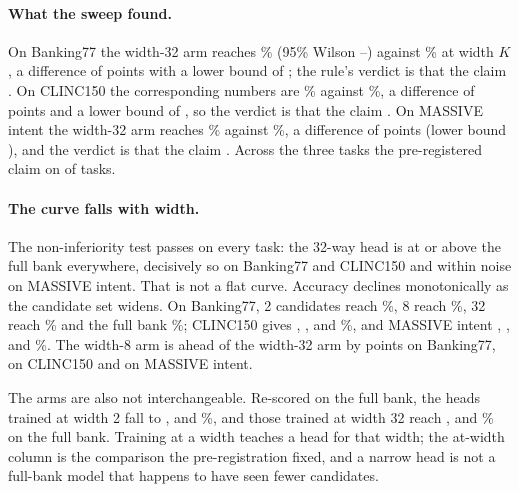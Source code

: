 

\paragraph{What the sweep found.} On Banking77 the width-32 arm reaches
\EBankWThirtyTwo\% (95\% Wilson \EBankWThirtyTwoLo--\EBankWThirtyTwoHi) against \EBankWK\% at
width \(K\), a difference of \EBankDelta{} points with a lower bound of
\EBankLower{}; the rule's verdict is that the claim \EBankVerdict. On CLINC150
the corresponding numbers are \EClincWThirtyTwo\% against \EClincWK\%, a
difference of \EClincDelta{} points and a lower bound of \EClincLower, so the
verdict is that the claim \EClincVerdict. On MASSIVE intent the width-32 arm
reaches \EMassiveWThirtyTwo\% against \EMassiveWK\%, a difference of
\EMassiveDelta{} points (lower bound \EMassiveLower), and the verdict is that the
claim \EMassiveVerdict. Across the three tasks the pre-registered claim
\EAggregateVerdict{} on \EHolds{} of \ETasks{} tasks.

\paragraph{The curve falls with width.} The non-inferiority test passes on every
task: the 32-way head is at or above the full bank everywhere, decisively so on
Banking77 and CLINC150 and within noise on MASSIVE intent. That is not a flat curve. Accuracy declines
monotonically as the candidate set widens. On Banking77, 2 candidates reach
\EBankWTwo\%, 8 reach \EBankWEight\%, 32 reach \EBankWThirtyTwo\% and the full bank
\EBankWK\%; CLINC150 gives \EClincWTwo, \EClincWEight, \EClincWThirtyTwo{} and
\EClincWK\%, and MASSIVE intent \EMassiveWTwo, \EMassiveWEight, \EMassiveWThirtyTwo{}
and \EMassiveWK\%. The width-8 arm is ahead of the width-32 arm by
\EBankWidthEightVsThirtyTwo{} points on Banking77, \EClincWidthEightVsThirtyTwo{} on CLINC150 and
\EMassiveWidthEightVsThirtyTwo{} on MASSIVE intent.

The arms are also not interchangeable. Re-scored on the full bank, the heads
trained at width 2 fall to \EBankFullKAtTwo, \EClincFullKAtTwo{} and
\EMassiveFullKAtTwo\%, and those trained at width 32 reach \EBankFullKAtThirtyTwo,
\EClincFullKAtThirtyTwo{} and \EMassiveFullKAtThirtyTwo\% on the full bank. Training at a
width teaches a head for that width; the at-width column is the comparison the
pre-registration fixed, and a narrow head is not a full-bank model that happens
to have seen fewer candidates.

